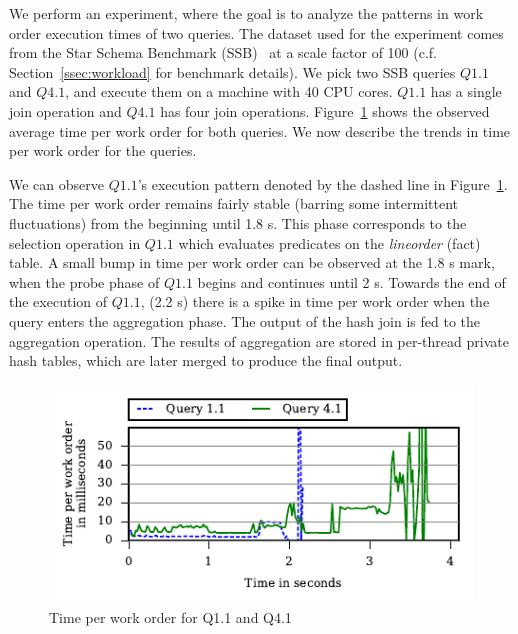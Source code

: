 We perform an experiment, where the goal is to analyze the patterns in work order execution times of two queries. 
The dataset used for the experiment comes from the Star Schema Benchmark (SSB)~\cite{ssb} 
at a scale factor of 100 (c.f. Section~\ref{ssec:workload} for benchmark details).
We pick two SSB queries $Q1.1$ and $Q4.1$, and execute them on a machine with 40 CPU cores. 
$Q1.1$ has a single join operation and $Q4.1$ has four join operations.
Figure~\ref{fig:q1.1-q4.1-time-per-wo} shows the observed average time per work order for both queries.
We now describe the trends in time per work order for the queries.

We can observe $Q1.1$'s execution pattern denoted by the dashed line in Figure~\ref{fig:q1.1-q4.1-time-per-wo}. 
The time per work order remains fairly stable (barring some intermittent fluctuations) from the beginning until 1.8 s.
This phase corresponds to the selection operation in $Q1.1$ which evaluates predicates on the \textit{lineorder} (fact) table.
A small bump in time per work order can be observed at the 1.8 s mark, when the probe phase of $Q1.1$ begins and continues until 2 s.
Towards the end of the execution of $Q1.1$, (2.2 s) there is a spike in time per work order when the query enters the aggregation phase. 
The output of the hash join is fed to the aggregation operation. 
The results of aggregation are stored in per-thread private hash tables, which are later merged to produce the final output.

\begin{figure}[h]
	\centering
	\includegraphics[width=\columnwidth]{figures/q11-q41-time-per-wo.pdf}
	\vspace{-2.5em}
	\caption{Time per work order for Q1.1 and Q4.1}
	\label{fig:q1.1-q4.1-time-per-wo}
\end{figure}

